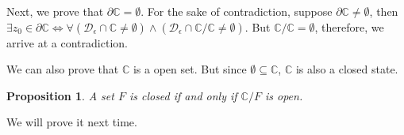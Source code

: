 \documentclass{article}
\newtheorem{proposition}[theorem]{Proposition}
\newtheorem{one minute paper}[theorem]{One Minute Paper}
\begin{document}
Next, we prove that $\partial \mathbb{C} = \emptyset$. For the sake of contradiction, suppose $\partial \mathbb{C} \neq \emptyset$, then $\exists z_0 \in \partial \mathbb{C} \iff \forall (\mathcal{D}_{\epsilon} \cap \mathbb{C} \neq \emptyset) \land (\mathcal{D}_{\epsilon} \cap \mathbb{C}/\mathbb{C} \neq \emptyset)$.
But $\mathbb{C}/\mathbb{C} = \emptyset$, therefore, we arrive at a contradiction. 

We can also prove that $\mathbb{C}$ is a open set. But since $\emptyset \subseteq \mathbb{C}$, $\mathbb{C}$ is also a closed state. 

\begin{proposition}
    A set $F$ is closed if and only if $\mathbb{C}/F$ is open. 
\end{proposition}

We will prove it next time. 
\end{document}
